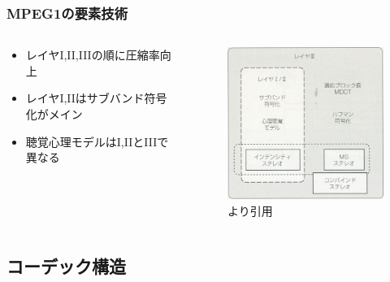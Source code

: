 \documentclass[14pt,xcolor=dvipsnames,table,dvipdfmx]{beamer}
\begin{document}
\begin{frame}[c]
    \frametitle{MPEG1の要素技術}
    \begin{columns}
        \begin{column}{0.4\textwidth}
            \begin{itemize}
                \item レイヤI,II,IIIの順に圧縮率向上
                \item レイヤI,IIはサブバンド符号化がメイン
                \item 聴覚心理モデルはI,IIとIIIで異なる
            \end{itemize}
        \end{column}
        \begin{column}{0.6\textwidth}
            \begin{figure}
                \includegraphics[width=70mm]{./figs/mpeg1_element_technologies.jpg}
                \caption*{\cite{fujiwara2001}より引用}
            \end{figure}
        \end{column}
    \end{columns}
\end{frame}

\subsection{コーデック構造}
\end{document}
